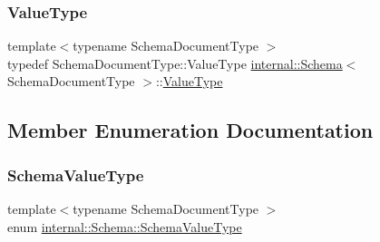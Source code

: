 \mbox{\label{classinternal_1_1Schema_a8976b6d7e2a885483d0b51d941019340}} 
\subsubsection{\texorpdfstring{Value\+Type}{ValueType}}
{\footnotesize\ttfamily template$<$typename Schema\+Document\+Type $>$ \\
typedef Schema\+Document\+Type\+::\+Value\+Type \hyperlink{classinternal_1_1Schema}{internal\+::\+Schema}$<$ Schema\+Document\+Type $>$\+::\hyperlink{classinternal_1_1Schema_a8976b6d7e2a885483d0b51d941019340}{Value\+Type}}



\subsection{Member Enumeration Documentation}
\mbox{\label{classinternal_1_1Schema_af45f73b2656b8878656190cb1fda4adb}} 
\subsubsection{\texorpdfstring{Schema\+Value\+Type}{SchemaValueType}}
{\footnotesize\ttfamily template$<$typename Schema\+Document\+Type $>$ \\
enum \hyperlink{classinternal_1_1Schema_af45f73b2656b8878656190cb1fda4adb}{internal\+::\+Schema\+::\+Schema\+Value\+Type}\hspace{0.3cm}{\ttfamily [private]}}

